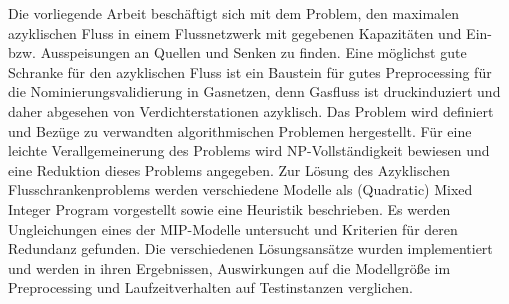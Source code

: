 Die vorliegende Arbeit beschäftigt sich mit dem Problem, den maximalen azyklischen Fluss in einem 
Flussnetzwerk mit gegebenen Kapazitäten und Ein- bzw. Ausspeisungen an Quellen und Senken zu finden. 
Eine möglichst gute Schranke für den azyklischen Fluss ist ein Baustein für gutes Preprocessing 
für die Nominierungsvalidierung in Gasnetzen, denn Gasfluss ist druckinduziert und daher abgesehen von 
Verdichterstationen azyklisch. 
Das Problem wird definiert und Bezüge zu verwandten algorithmischen Problemen hergestellt. 
Für eine leichte Verallgemeinerung des Problems wird NP-Vollständigkeit bewiesen und eine 
Reduktion dieses Problems angegeben. 
Zur Lösung des Azyklischen Flusschrankenproblems werden verschiedene Modelle als (Quadratic) Mixed Integer Program vorgestellt
sowie eine Heuristik beschrieben. Es werden Ungleichungen eines der MIP-Modelle
untersucht und Kriterien für deren Redundanz gefunden. 
Die verschiedenen Lösungsansätze wurden implementiert und werden in ihren Ergebnissen, Auswirkungen auf
die Modellgröße im Preprocessing und Laufzeitverhalten auf Testinstanzen verglichen.